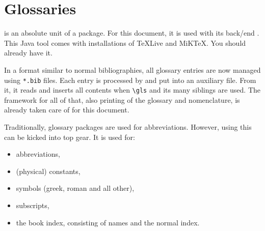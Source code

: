 \section{Glossaries}

 is an absolute unit of a package.
For this document, it is used with its back\-/end .
This Java tool comes with installations of TeXLive and MiKTeX.
You should already have it.

In a format similar to normal bibliographies, all glossary entries are now managed
using \texttt{*.bib} files.
Each entry is processed by  and put into an auxiliary file.
From it, it reads and inserts all contents when \verb|\gls| and its many siblings
are used.
The framework for all of that, also printing of the glossary and nomenclature,
is already taken care of for this document.

Traditionally, glossary packages are used for abbreviations.
However, using  this can be kicked into top gear.
It is used for:
\begin{itemize}
    \item abbreviations,
    \item (physical) constants,
    \item symbols (greek, roman and all other),
    \item subscripts,
    \item the book index, consisting of names and the normal index.
\end{itemize}

